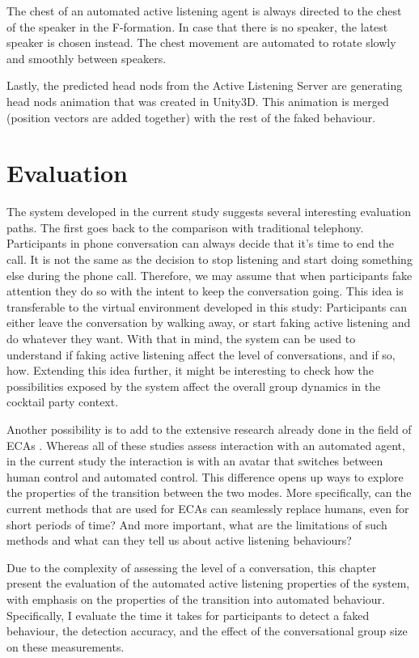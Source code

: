 \documentclass[]{simple-thesis}
\begin{document}
The chest of an automated active listening agent is always directed to the chest of the speaker in the F-formation.
In case that there is no speaker, the latest speaker is chosen instead.
The chest movement are automated to rotate slowly and smoothly between speakers.

Lastly, the predicted head nods from the Active Listening Server are generating head nods animation that was created in Unity3D.
This animation is merged (position vectors are added together) with the rest of the faked behaviour.


\chapter{Evaluation}\label{evaluation}

The system developed in the current study suggests several interesting evaluation paths.
The first goes back to the comparison with traditional telephony.
Participants in phone conversation can always decide that it's time to end the call.
It is not the same as the decision to stop listening and start doing something else during the phone call.
Therefore, we may assume that when participants fake attention they do so with the intent to keep the conversation going.
This idea is transferable to the virtual environment developed in this study:
Participants can either leave the conversation by walking away, or start faking active listening and do whatever they want.
With that in mind, the system can be used to understand if faking active listening affect the level of conversations, and if so, how.
Extending this idea further, it might be interesting to check how the possibilities exposed by the system affect the overall group dynamics in the cocktail party context.

Another possibility is to add to the extensive research already done in the field of ECAs \citep{Nishimura2007, Bevacqua2008, Gratch2007, Huang2011, Lee2006, Poppe2013}.
Whereas all of these studies assess interaction with an automated agent, in the current study the interaction is with an avatar that switches between human control and automated control.
This difference opens up ways to explore the properties of the transition between the two modes.
More specifically, can the current methods that are used for ECAs can seamlessly replace humans, even for short periods of time?
And more important, what are the limitations of such methods and what can they tell us about active listening behaviours?

Due to the complexity of assessing the level of a conversation, this chapter present the evaluation of the automated active listening properties of the system, with emphasis on the properties of the transition into automated behaviour.
Specifically, I evaluate the time it takes for participants to detect a faked behaviour, the detection accuracy, and the effect of the conversational group size on these measurements.
\end{document}
